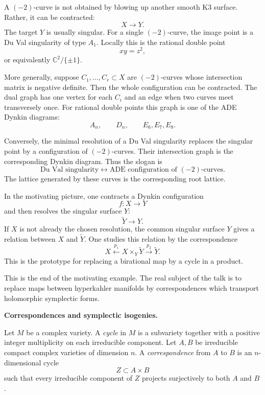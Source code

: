 \documentclass{book}
\begin{document}
\medskip
A $(-2)$-curve is not obtained by blowing up
another smooth K3 surface.
Rather, it can be contracted:
$$
X \longrightarrow Y.
$$
The target $Y$ is usually singular.
For a single $(-2)$-curve, the image point is
a Du Val singularity of type $A_1$.
Locally this is the rational double point
$$
xy=z^2,
$$
or equivalently $\mathbb{C}^2/\{\pm 1\}$.

\medskip
More generally, suppose
$C_1,\ldots,C_r \subset X$ are $(-2)$-curves
whose intersection matrix is negative
definite.
Then the whole configuration can be
contracted.
The dual graph has one vertex for each
$C_i$ and an edge when two curves meet
transversely once.
For rational double points this graph is one
of the ADE Dynkin diagrams:
$$
A_n,\qquad D_n,\qquad E_6,E_7,E_8.
$$

\medskip
Conversely, the minimal resolution of a
Du Val singularity replaces the singular
point by a configuration of $(-2)$-curves.
Their intersection graph is the corresponding
Dynkin diagram.
Thus the slogan is
$$
\text{Du Val singularity}
\longleftrightarrow
\text{ADE configuration of }
(-2)\text{-curves}.
$$
The lattice generated by these curves is the
corresponding root lattice.

\medskip
In the motivating picture, one contracts a
Dynkin configuration
$$
f:X\longrightarrow Y
$$
and then resolves the singular surface $Y$:
$$
\widetilde{Y}\longrightarrow Y.
$$
If $X$ is not already the chosen resolution,
the common singular surface $Y$ gives a
relation between $X$ and $\widetilde{Y}$.
One studies this relation by the
correspondence
$$
X \xleftarrow{\ p_1\ }
X\times_Y\widetilde{Y}
\xrightarrow{\ p_2\ }\widetilde{Y}.
$$
This is the prototype for replacing a
birational map by a cycle in a product.

\medskip
This is the end of the motivating example.
The real subject of the talk is to replace
maps between hyperkahler manifolds by
correspondences which transport holomorphic
symplectic forms.

\medskip
{\bf Correspondences and symplectic
isogenies.}

\begin{definition}
\label{definition-correspondence-verbitsky}
Let $M$ be a complex variety.
A {\it cycle} in $M$ is a subvariety
together with a positive integer
multiplicity on each irreducible component.
Let $A,B$ be irreducible compact complex
varieties of dimension $n$.
A {\it correspondence} from $A$ to $B$ is an
$n$-dimensional cycle
$$
Z\subset A\times B
$$
such that every irreducible component of
$Z$ projects surjectively to both $A$ and
$B$.
\end{definition}
\end{document}
